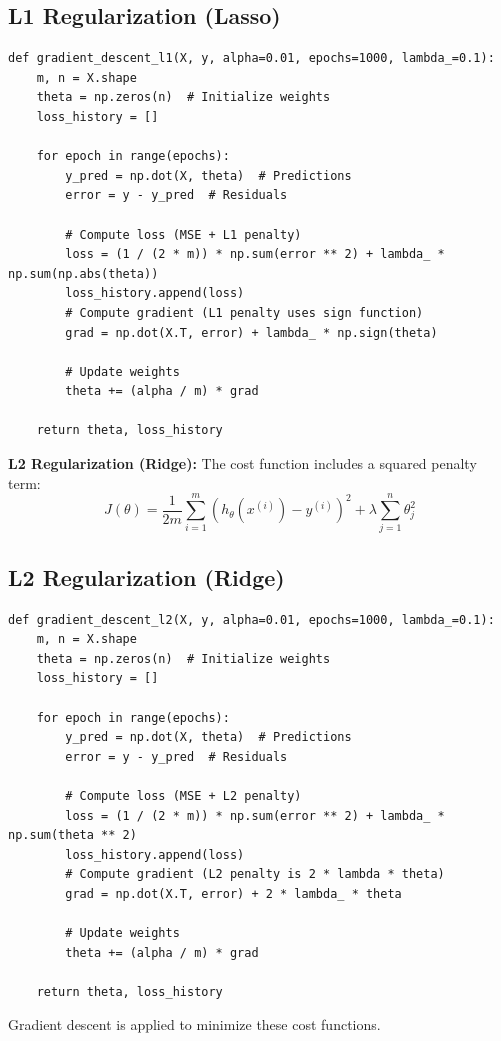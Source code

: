 \documentclass{article}
\begin{document}
\subsection{L1 Regularization (Lasso)}
\begin{lstlisting}
def gradient_descent_l1(X, y, alpha=0.01, epochs=1000, lambda_=0.1):
    m, n = X.shape
    theta = np.zeros(n)  # Initialize weights
    loss_history = []

    for epoch in range(epochs):
        y_pred = np.dot(X, theta)  # Predictions
        error = y - y_pred  # Residuals

        # Compute loss (MSE + L1 penalty)
        loss = (1 / (2 * m)) * np.sum(error ** 2) + lambda_ * np.sum(np.abs(theta))
        loss_history.append(loss)
        # Compute gradient (L1 penalty uses sign function)
        grad = np.dot(X.T, error) + lambda_ * np.sign(theta)

        # Update weights
        theta += (alpha / m) * grad

    return theta, loss_history

\end{lstlisting}


\textbf{L2 Regularization (Ridge):} The cost function includes a squared penalty term:
\begin{equation}
    J(\theta) = \frac{1}{2m} \sum_{i=1}^{m} (h_\theta(x^{(i)}) - y^{(i)})^2 + \lambda \sum_{j=1}^{n} \theta_j^2
\end{equation}
\subsection{L2 Regularization (Ridge)}
\begin{lstlisting}
def gradient_descent_l2(X, y, alpha=0.01, epochs=1000, lambda_=0.1):
    m, n = X.shape
    theta = np.zeros(n)  # Initialize weights
    loss_history = []
  
    for epoch in range(epochs):
        y_pred = np.dot(X, theta)  # Predictions
        error = y - y_pred  # Residuals

        # Compute loss (MSE + L2 penalty)
        loss = (1 / (2 * m)) * np.sum(error ** 2) + lambda_ * np.sum(theta ** 2)
        loss_history.append(loss)
        # Compute gradient (L2 penalty is 2 * lambda * theta)
        grad = np.dot(X.T, error) + 2 * lambda_ * theta

        # Update weights
        theta += (alpha / m) * grad

    return theta, loss_history
\end{lstlisting}
Gradient descent is applied to minimize these cost functions.
\end{document}
